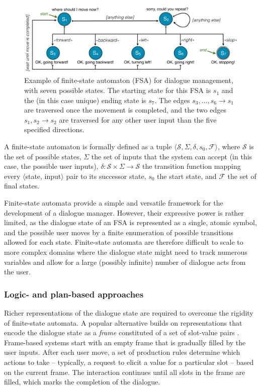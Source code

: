 \begin{figure}[h]
\centering
\includegraphics[scale=0.35]{imgs/fsa.pdf}
\caption{Example of finite-state automaton (FSA) for dialogue management, with seven possible states. The starting state for this FSA is $s_1$ and the (in this case unique) ending state is $s_7$. The edges $s_3,\dots, s_6 \rightarrow s_1$ are traversed once the movement is completed, and the two edges $s_1, s_2 \rightarrow s_2$ are traversed for any other user input than the five specified directions.}
\label{fig:fsa}
\end{figure}

A finite-state automaton is formally defined as a tuple $\langle \mathcal{S}, \Sigma, \delta, s_0, \mathcal{F} \rangle$, where $\mathcal{S}$ is the set of possible states, $\Sigma$ the set of inputs that the system can accept (in this case, the possible user inputs),  $\delta: \mathcal{S} \times \Sigma \rightarrow \mathcal{S}$ the transition function mapping every $\langle$state, input$\rangle$ pair to its successor state, $s_0$ the start state, and $\mathcal{F}$ the set of final states. 

Finite-state automata provide a simple and versatile framework for the development of a dialogue manager. However, their expressive power is rather limited, as the dialogue state of an FSA is represented as a single, atomic symbol, and the possible user moves by a finite enumeration of possible transitions allowed for each state.  Finite-state automata are therefore difficult to scale to more complex domains where the dialogue state might need to track numerous variables and allow for a large (possibly infinite) number of dialogue acts from the user.  

\subsubsection*{Logic- and plan-based approaches}

Richer representations of the dialogue state are required to overcome the rigidity of finite-state automata. A popular alternative builds on representations that encode the dialogue state as a \textit{frame} constituted of a set of slot-value pairs \citep{seneff2000}.  Frame-based systems start with an empty frame that is gradually filled by the user inputs.  After each user move, a set of production rules determine which actions to take  -- typically, a request to elicit a value for a particular slot -- based on the current frame.  The interaction continues until all slots in the frame are filled, which marks the completion of the dialogue. 

